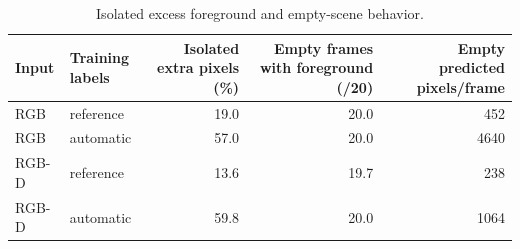 \begin{table}[H]
\caption{Isolated excess foreground and empty-scene behavior.}\label{tab:error-types}
\centering\small
\begin{tabular}{llrrr}
\toprule Input & Training labels & Isolated extra pixels (\%) & Empty frames with foreground (/20) & Empty predicted pixels/frame\\\midrule
RGB & reference & 19.0 & 20.0 & 452\\
RGB & automatic & 57.0 & 20.0 & 4640\\
RGB-D & reference & 13.6 & 19.7 & 238\\
RGB-D & automatic & 59.8 & 20.0 & 1064\\
\bottomrule\end{tabular}
\end{table}
